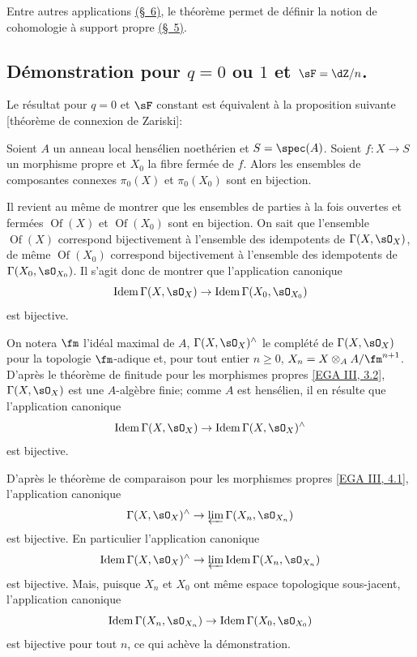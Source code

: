 Entre autres applications \hyperref[I:4-6]{(\S~6)}, le théorème permet de définir la notion 
de cohomologie à support propre \hyperref[I:4-5]{(\S~5)}. 










\subsection{Démonstration pour \texorpdfstring{$q=0$}{q=0} ou \texorpdfstring{$1$}{1} et \texorpdfstring{$\sF=\dZ/n$}{F=Z/n}.}\label{I:4-2} 

Le résultat pour $q=0$ et $\sF$ constant est équivalent à la proposition 
suivante [théorème de connexion de Zariski]:





\begin{propositiondotdash}\label{I:4-2-1}
Soient $A$ un anneau local hensélien noethérien et $S=\spec(A)$. 
Soient $f:X\to S$ un morphisme propre et $X_0$ la fibre fermée de $f$. Alors 
les ensembles de composantes connexes $\pi_0(X)$ et $\pi_0(X_0)$ sont en 
bijection.
\end{propositiondotdash}

Il revient au même de montrer que les ensembles de parties à la fois 
ouvertes et fermées $\operatorname{Of}(X)$ et $\operatorname{Of}(X_0)$ sont 
en bijection. On sait que l'ensemble $\operatorname{Of}(X)$ correspond 
bijectivement à l'ensemble des idempotents de $\Gamma(X,\sO_X)$, de même 
$\operatorname{Of}(X_0)$ correspond bijectivement à l'ensemble des 
idempotents de $\Gamma(X_0,\sO_{X_0})$. Il s'agit donc de montrer que 
l'application canonique 
\[
  \operatorname{Idem} \Gamma(X,\sO_X) \to \operatorname{Idem}\Gamma(X_0,\sO_{X_0})
\]
est bijective. 

On notera $\fm$ l'idéal maximal de $A$, $\Gamma(X,\sO_X)^\wedge$ le complété 
de $\Gamma(X,\sO_X)$ pour la topologie $\fm$-adique et, pour tout entier 
$n\geqslant 0$, $X_n=X\otimes_A A/\fm^{n+1}$. D'après le théorème de finitude 
pour les morphismes propres \hyperlink{cite.ega}{[EGA III, 3.2]}, $\Gamma(X,\sO_X)$ est une 
$A$-algèbre finie; comme $A$ est hensélien, il en résulte que 
l'application canonique 
\[
  \operatorname{Idem} \Gamma(X,\sO_X) \to \operatorname{Idem}\Gamma(X,\sO_X)^\wedge
\]
est bijective. 

D'après le théorème de comparaison pour les morphismes propres 
\hyperlink{cite.ega}{[EGA III, 4.1]}, l'application canonique 
\[
  \Gamma(X,\sO_X)^\wedge \to \varprojlim \Gamma(X_n,\sO_{X_n})
\]
est bijective. En particulier l'application canonique 
\[
  \operatorname{Idem} \Gamma(X,\sO_X)^\wedge \to \varprojlim \operatorname{Idem}\Gamma(X_n,\sO_{X_n})
\]
est bijective. Mais, puisque $X_n$ et $X_0$ ont même espace topologique 
sous-jacent, l'application canonique 
\[
  \operatorname{Idem}\Gamma(X_n,\sO_{X_n}) \to \operatorname{Idem} \Gamma(X_0,\sO_{X_0})
\]
est bijective pour tout $n$, ce qui achève la démonstration. 

